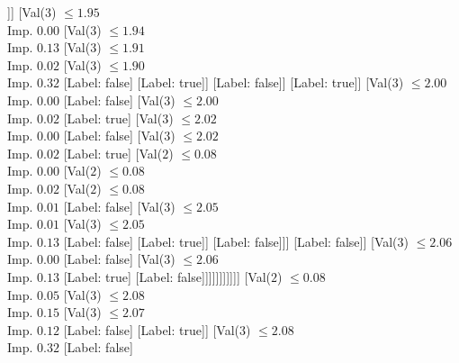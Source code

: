 \documentclass[margin=10pt]{standalone}
\begin{document}
\begin{forest}
											[Val($3$) $ \leq 2.00$ \\ Imp. $0.26$
												[Label: true]
												[Val($3$) $ \leq 2.05$ \\ Imp. $0.12$
													[Label: false]
													[Label: true]]]
											[Val($3$) $ \leq 1.95$ \\ Imp. $0.00$
												[Val($3$) $ \leq 1.94$ \\ Imp. $0.13$
													[Val($3$) $ \leq 1.91$ \\ Imp. $0.02$
														[Val($3$) $ \leq 1.90$ \\ Imp. $0.32$
															[Label: false]
															[Label: true]]
														[Label: false]]
													[Label: true]]
												[Val($3$) $ \leq 2.00$ \\ Imp. $0.00$
													[Label: false]
													[Val($3$) $ \leq 2.00$ \\ Imp. $0.02$
														[Label: true]
														[Val($3$) $ \leq 2.02$ \\ Imp. $0.00$
															[Label: false]
															[Val($3$) $ \leq 2.02$ \\ Imp. $0.02$
																[Label: true]
																[Val($2$) $ \leq 0.08$ \\ Imp. $0.00$
																	[Val($2$) $ \leq 0.08$ \\ Imp. $0.02$
																		[Val($2$) $ \leq 0.08$ \\ Imp. $0.01$
																			[Label: false]
																			[Val($3$) $ \leq 2.05$ \\ Imp. $0.01$
																				[Val($3$) $ \leq 2.05$ \\ Imp. $0.13$
																					[Label: false]
																					[Label: true]]
																				[Label: false]]]
																		[Label: false]]
																	[Val($3$) $ \leq 2.06$ \\ Imp. $0.00$
																		[Label: false]
																		[Val($3$) $ \leq 2.06$ \\ Imp. $0.13$
																			[Label: true]
																			[Label: false]]]]]]]]]]]
									[Val($2$) $ \leq 0.08$ \\ Imp. $0.05$
										[Val($3$) $ \leq 2.08$ \\ Imp. $0.15$
											[Val($3$) $ \leq 2.07$ \\ Imp. $0.12$
												[Label: false]
												[Label: true]]
											[Val($3$) $ \leq 2.08$ \\ Imp. $0.32$
												[Label: false]

\end{forest}
\end{document}
